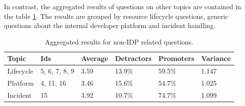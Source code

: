\documentclass[a4paper,12pt]{article}
\begin{document}
    In contrast, the aggregated results of questions on other topics are contained in the table \ref{tab:nonidpresults}.
    The results are grouped by resource lifecycle questions, generic questions about the internal developer platform
    and incident handling.\\
    \begin{table}[!htbp]
        \begin{center}
            \begin{tabularx}{\textwidth}{llllll}
                \toprule
                Topic     & Ids           & Average & Detractors & Promoters & Variance \\
                \midrule
                Lifecycle & 5, 6, 7, 8, 9 & 3.59    & 13.9\%     & 59.5\%    & 1.147    \\
                Platform  & 4, 11, 16     & 3.46    & 15.6\%     & 54.7\%    & 1.025    \\
                Incident  & 15            & 3.92    & 10.7\%     & 74.7\%    & 1.099    \\
                \bottomrule
            \end{tabularx}
        \end{center}
        \caption{\label{tab:nonidpresults} Aggregated results for non-IDP related questions.}
    \end{table}
    \FloatBarrier
\end{document}
